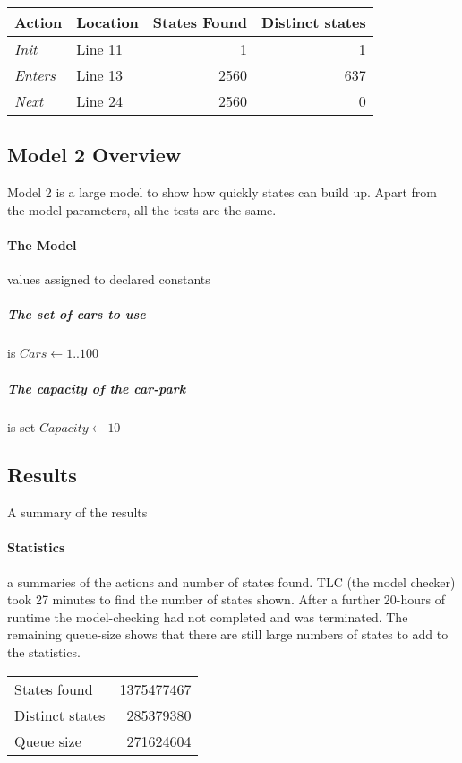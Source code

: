 \documentclass[12pt]{article}
\begin{document}
\begin{table}[h]
\begin{tabular}{llrr}
	\textbf{Action} & Location & States Found & \textbf{Distinct states} \\
	\hline
	\textit{Init}   & Line 11 & 1 & 1 \\
	\textit{Enters} & Line 13 & \num{2560} & 637 \\
	\textit{Next}   & Line 24 & \num{2560} & 0 
\end{tabular}
\end{table}

\subsection{Model 2 Overview}
Model 2 is a large model to show how quickly states can build up.
Apart from the model parameters, all the tests are the same.

\paragraph{The Model} values assigned to declared constants
\subparagraph{The set of cars to use} is $\mathit{Cars}\leftarrow 1..100$
\subparagraph{The capacity of the car-park} is set
$\mathit{Capacity}\leftarrow 10$

\subsection{Results} A summary of the results
\paragraph{Statistics} a summaries of the actions and number of states
found.  TLC (the model checker) took 27 minutes to find the number of states
shown.  After a further 20-hours of runtime the model-checking had not
completed and was terminated.  The remaining queue-size shows that there are
still large numbers of states to add to the statistics.

\begin{table}[h]
\begin{tabular}{lr}
	States found & \num{1375477467} \\
	Distinct states & \num{285379380} \\ 
	Queue size 		& \num{271624604} \\
\end{tabular}
\end{table}
\end{document}
